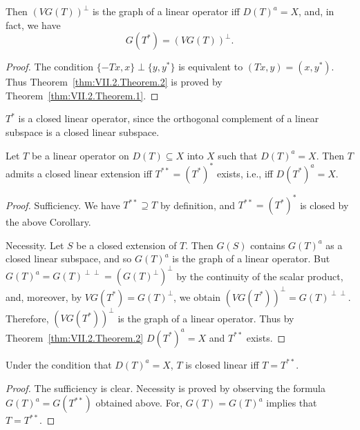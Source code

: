 Then $(VG(T))^{\perp}$ is the graph of a linear operator iff $D(T)^{a} = X$, and, in fact, we have 
\begin{equation}\label{eq:VII.2.3}
G (T ^{*}) = (V G (T)) ^{\perp}.
\end{equation}

\begin{proof}
 The condition $\{-Tx, x\} \perp \{y, y^*\}$ is equivalent to $(Tx, y) = (x, y^*)$. Thus Theorem~\ref{thm:VII.2.Theorem.2} is proved by Theorem~\ref{thm:VII.2.Theorem.1}. 
\end{proof}

\begin{corollaryu} $T^{*}$ is a closed linear operator, since the orthogonal complement of a linear subspace is a closed linear subspace. 
\end{corollaryu}

\begin{theorem}\label{thm:VII.2.Theorem.3} Let $T$ be a linear operator on $D(T) \subseteq X$ into $X$ such that $D(T)^a = X$. Then $T$ admits a closed linear extension iff $T^{**} = (T^*)^*$ exists, i.e., iff $D(T^*)^a = X$. 
\end{theorem}

\begin{proof}
 Sufficiency. We have $T^{**} \supseteq T$ by definition, and $T^{**} = (T^{*})^{*}$ is closed by the above Corollary. 

Necessity. Let $S$ be a closed extension of $T$. Then $G(S)$ contains $G(T)^{a}$ as a closed linear subspace, and so $G(T)^{a}$ is the graph of a linear operator. But $G(T)^{a} = G(T)^{\perp\perp} = (G(T)^{\perp})^{\perp}$ by the continuity of the scalar product, and, moreover, by $VG(T^{*}) = G(T)^{\perp}$, we obtain $(VG(T^{*}))^{\perp} = G(T)^{\perp\perp}$. Therefore, $(VG(T^{*}))^{\perp}$ is the graph of a linear operator. Thus by Theorem~\ref{thm:VII.2.Theorem.2} $D(T^{*})^{a} = X$ and $T^{**}$ exists. 
\end{proof}

\begin{corollaryu} Under the condition that $D(T)^{a}=X$, $T$ is closed linear iff $T=T^{**}$. 
\end{corollaryu}

\begin{proof}
 The sufficiency is clear. Necessity is proved by observing the formula $G(T)^{a} = G(T^{**})$ obtained above. For, $G(T) = G(T)^{a}$ implies that $T = T^{**}$. 
\end{proof}

